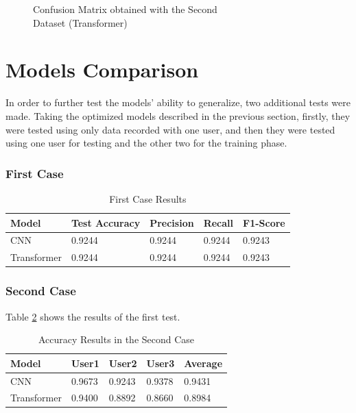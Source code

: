 \begin{figure}[H]
    \centering
    {\fontsize{10}{12}\selectfont}
    \caption[Confusion Matrix obtained with the Second Dataset (Transformer)]{Confusion Matrix obtained with the Second\\Dataset (Transformer)}
    \label{fig:transformer_dataset2_confusion_matrix}
\end{figure}

\section{Models Comparison}

In order to further test the models' ability to generalize, two additional tests were made. Taking the optimized models described in the previous section, firstly, they were tested using only data recorded with one user, and then they were tested using one user for testing and the other two for the training phase. 

\subsubsection{First Case}

\begin{table}[H]
    \centering
    \caption{First Case Results}
    \label{table:results_first_case}
    \begin{tabular}{|l|l|l|l|l|}
        \hline
        Model & Test Accuracy & Precision & Recall & F1-Score \\
        \hline
        CNN & 0.9244 & 0.9244 & 0.9244 & 0.9243 \\
        \hline
        Transformer & 0.9244 & 0.9244 & 0.9244 & 0.9243 \\
        \hline
    \end{tabular}
\end{table}

\subsubsection{Second Case}

Table \ref{table:results_second_case_acc} shows the results of the first test.

\begin{table}[H]
    \centering
    \caption{Accuracy Results in the Second Case}
    \label{table:results_second_case_acc}
    \begin{tabular}{|l|l|l|l|l|}
        \hline
        Model & User1 & User2 & User3 & Average \\
        \hline
        CNN & 0.9673 & 0.9243 & 0.9378 & 0.9431 \\
        \hline
        Transformer & 0.9400 & 0.8892 &  0.8660 & 0.8984 \\
        \hline
    \end{tabular}
\end{table}


